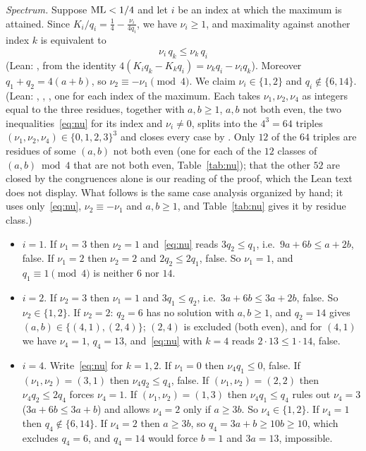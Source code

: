 \documentclass[11pt]{article}
\theoremstyle{remark}
\newcommand{\lean}[1]{{\small\texttt{\detokenize{#1}}}}
\begin{document}
\emph{Spectrum.} Suppose $\mathrm{ML}<1/4$ and let $i$ be an index at which the maximum is attained. Since $K_i/q_i=\frac14-\frac{\nu_i}{4q_i}$, we have $\nu_i\ge1$, and maximality against another index $k$ is equivalent to
\begin{equation}\label{eq:nu}
\nu_i\,q_k\le\nu_k\,q_i
\end{equation}
(Lean: \lean{ineq_of_le}, from the identity $4(K_iq_k-K_kq_i)=\nu_kq_i-\nu_iq_k$). Moreover $q_1+q_2=4(a+b)$, so $\nu_2\equiv-\nu_1\pmod4$. We claim $\nu_i\in\{1,2\}$ and $q_i\notin\{6,14\}$. (Lean: \lean{win1}, \lean{win2}, \lean{win4}, one for each index of the maximum. Each takes $\nu_1,\nu_2,\nu_4$ as integers equal to the three residues, together with $a,b\ge1$, $a,b$ not both even, the two inequalities~\eqref{eq:nu} for its index and $\nu_i\ne0$, splits into the $4^3=64$ triples $(\nu_1,\nu_2,\nu_4)\in\{0,1,2,3\}^3$ and closes every case by \lean{omega}. Only $12$ of the $64$ triples are residues of some $(a,b)$ not both even (one for each of the $12$ classes of $(a,b)\bmod4$ that are not both even, Table~\ref{tab:nu}); that the other $52$ are closed by the congruences alone is our reading of the proof, which the Lean text does not display. What follows is the same case analysis organized by hand; it uses only~\eqref{eq:nu}, $\nu_2\equiv-\nu_1$ and $a,b\ge1$, and Table~\ref{tab:nu} gives it by residue class.)
\begin{itemize}
\item $i=1$. If $\nu_1=3$ then $\nu_2=1$ and~\eqref{eq:nu} reads $3q_2\le q_1$, i.e.\ $9a+6b\le a+2b$, false. If $\nu_1=2$ then $\nu_2=2$ and $2q_2\le 2q_1$, false. So $\nu_1=1$, and $q_1\equiv1\pmod4$ is neither $6$ nor $14$.
\item $i=2$. If $\nu_2=3$ then $\nu_1=1$ and $3q_1\le q_2$, i.e.\ $3a+6b\le 3a+2b$, false. So $\nu_2\in\{1,2\}$. If $\nu_2=2$: $q_2=6$ has no solution with $a,b\ge1$, and $q_2=14$ gives $(a,b)\in\{(4,1),(2,4)\}$; $(2,4)$ is excluded (both even), and for $(4,1)$ we have $\nu_4=1$, $q_4=13$, and~\eqref{eq:nu} with $k=4$ reads $2\cdot13\le1\cdot14$, false.
\item $i=4$. Write~\eqref{eq:nu} for $k=1,2$. If $\nu_1=0$ then $\nu_4q_1\le0$, false. If $(\nu_1,\nu_2)=(3,1)$ then $\nu_4q_2\le q_4$, false. If $(\nu_1,\nu_2)=(2,2)$ then $\nu_4q_2\le 2q_4$ forces $\nu_4=1$. If $(\nu_1,\nu_2)=(1,3)$ then $\nu_4q_1\le q_4$ rules out $\nu_4=3$ ($3a+6b\le 3a+b$) and allows $\nu_4=2$ only if $a\ge3b$. So $\nu_4\in\{1,2\}$. If $\nu_4=1$ then $q_4\notin\{6,14\}$. If $\nu_4=2$ then $a\ge3b$, so $q_4=3a+b\ge10b\ge10$, which excludes $q_4=6$, and $q_4=14$ would force $b=1$ and $3a=13$, impossible.
\end{itemize}
\end{document}
